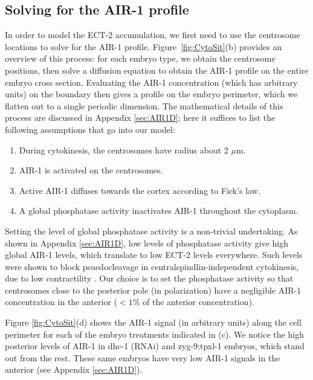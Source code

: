 \documentclass[11pt]{article}
\begin{document}
\subsection{Solving for the AIR-1 profile}
In order to model the ECT-2 accumulation, we first need to use the centrosome locations to solve for the AIR-1 profile. Figure\ \ref{fig:CytoSit}(b) provides an overview of this process: for each embryo type, we obtain the centrosome positions, then solve a diffusion equation to obtain the AIR-1 profile on the entire embryo cross section. Evaluating the AIR-1 concentration (which has arbitrary units) on the boundary then gives a profile on the embryo perimeter, which we flatten out to a single periodic dimension. The mathematical details of this process are discussed in Appendix \ref{sec:AIR1D}; here it suffices to list the following assumptions that go into our model:
\begin{enumerate}
\item During cytokinesis, the centrosomes have radius about 2 $\mu$m.
\item AIR-1 is activated on the centrosomes.
\item Active AIR-1 diffuses towards the cortex according to Fick's law.
\item A global phosphatase activity inactivates AIR-1 throughout the cytoplasm. 
\end{enumerate}
Setting the level of global phosphatase activity is a non-trivial undertaking. As shown in Appendix \ref{sec:AIR1D}, low levels of phosphatase activity give high global AIR-1 levels, which translate to low ECT-2 levels everywhere. Such levels were shown to block psuedocleavage in centralspindlin-independent cytokinesis, due to low contractility \citep{afshar2010regulation, kotak2016aurora}. Our choice is to set the phosphatase activity so that centrosomes close to the posterior pole (in polarization) have a negligible AIR-1 concentration in the anterior ($< 1\%$ of the anterior concentration).

Figure \ref{fig:CytoSit}(d) shows the AIR-1 signal (in arbitrary units) along the cell perimeter for each of the embryo treatments indicated in (c). We notice the high posterior levels of AIR-1 in dhc-1 (RNAi) and zyg-9;tpxl-1 embryos, which stand out from the rest. These same embryos have very low AIR-1 signals in the anterior (see Appendix \ref{sec:AIR1D}).
\end{document}
